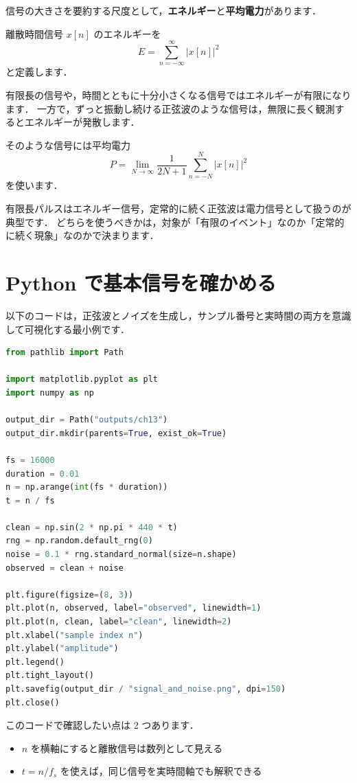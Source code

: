 信号の大きさを要約する尺度として，\textbf{エネルギー}と\textbf{平均電力}があります．

離散時間信号 $x[n]$ のエネルギーを
\[
E = \sum_{n=-\infty}^{\infty} |x[n]|^2
\]
と定義します．

有限長の信号や，時間とともに十分小さくなる信号ではエネルギーが有限になります．
一方で，ずっと振動し続ける正弦波のような信号は，無限に長く観測するとエネルギーが発散します．

そのような信号には平均電力
\[
P = \lim_{N \to \infty} \frac{1}{2N+1}\sum_{n=-N}^{N} |x[n]|^2
\]
を使います．

有限長パルスはエネルギー信号，定常的に続く正弦波は電力信号として扱うのが典型です．
どちらを使うべきかは，対象が「有限のイベント」なのか「定常的に続く現象」なのかで決まります．


\section{Python で基本信号を確かめる}

以下のコードは，正弦波とノイズを生成し，サンプル番号と実時間の両方を意識して可視化する最小例です．

\begin{lstlisting}[style=codecell,language=Python]
from pathlib import Path

import matplotlib.pyplot as plt
import numpy as np

output_dir = Path("outputs/ch13")
output_dir.mkdir(parents=True, exist_ok=True)

fs = 16000
duration = 0.01
n = np.arange(int(fs * duration))
t = n / fs

clean = np.sin(2 * np.pi * 440 * t)
rng = np.random.default_rng(0)
noise = 0.1 * rng.standard_normal(size=n.shape)
observed = clean + noise

plt.figure(figsize=(8, 3))
plt.plot(n, observed, label="observed", linewidth=1)
plt.plot(n, clean, label="clean", linewidth=2)
plt.xlabel("sample index n")
plt.ylabel("amplitude")
plt.legend()
plt.tight_layout()
plt.savefig(output_dir / "signal_and_noise.png", dpi=150)
plt.close()
\end{lstlisting}

このコードで確認したい点は 2 つあります．
\begin{itemize}
\item $n$ を横軸にすると離散信号は数列として見える
\item $t=n/f_s$ を使えば，同じ信号を実時間軸でも解釈できる
\end{itemize}

